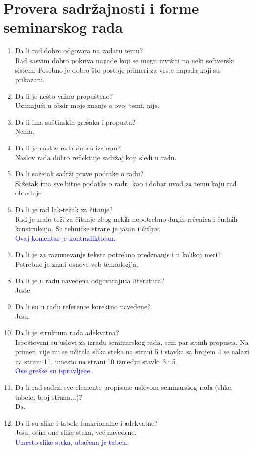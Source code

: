 \documentclass[a4paper]{report}
\newcommand{\odgovor}[1]{\textcolor{blue}{#1}}
\begin{document}
\section{Provera sadržajnosti i forme seminarskog rada}

\begin{enumerate}
\item Da li rad dobro odgovara na zadatu temu?\\
Rad sasvim dobro pokriva napade koji se mogu izvršiti na neki softverski sistem. Posebno je dobro što postoje primeri za vrste napada koji su prikazani.
\item Da li je nešto važno propušteno?\\
Uzimajući u obzir moje znanje o ovoj temi, nije.
\item Da li ima suštinskih grešaka i propusta?\\
Nema.
\item Da li je naslov rada dobro izabran?\\
Naslov rada dobro reflektuje sadržaj koji sledi u radu.
\item Da li sažetak sadrži prave podatke o radu?\\
Sažetak ima sve bitne podatke o radu, kao i dobar uvod za temu koju rad obrađuje.
\item Da li je rad lak-težak za čitanje?\\
Rad je malo teži za čitanje zbog nekih nepotrebno dugih rečenica i čudnih konstrukcija. Sa tehničke strane je jasan i čitljiv.\\
\odgovor{Ovaj komentar je kontradiktoran.}
\item Da li je za razumevanje teksta potrebno predznanje i u kolikoj meri?\\
Potrebno je znati osnove veb tehnologija.
\item Da li je u radu navedena odgovarajuća literatura?\\
Jeste.
\item Da li su u radu reference korektno navedene?\\
Jesu.
\item Da li je struktura rada adekvatna?\\
Ispoštovani su uslovi za izradu seminarskog rada, sem par sitnih propusta. Na primer, nije mi se učitala slika steka na strani 5 i stavka sa brojem 4 se nalazi na strani 11, umesto na strani 10 izmedju stavki 3 i 5.\\
\odgovor{Ove greške su ispravljene.}
\item Da li rad sadrži sve elemente propisane uslovom seminarskog rada (slike, tabele, broj strana...)?\\
Da.
\item Da li su slike i tabele funkcionalne i adekvatne?\\
Jesu, osim one slike steka, već navedene.\\
\odgovor{Umesto slike steka, ubačena je tabela.}
\end{enumerate}
\end{document}
